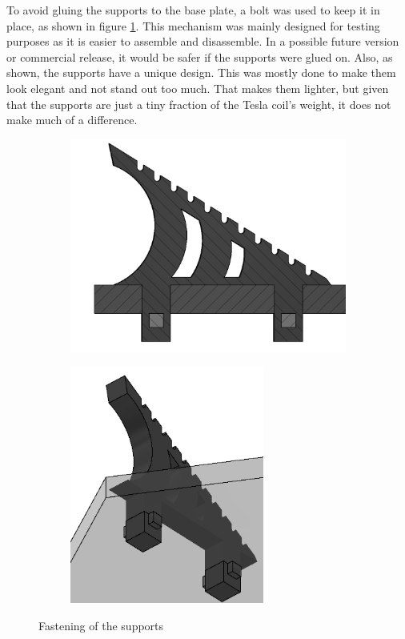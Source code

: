 To avoid gluing the supports to the base plate, a bolt was used to keep it in place, as shown in figure \ref{fig:stayer}. This mechanism was mainly designed for testing purposes as it is easier to assemble and disassemble. In a possible future version or commercial release, it would be safer if the supports were glued on. Also, as shown, the supports have a unique design. This was mostly done to make them look elegant and not stand out too much. That makes them lighter, but given that the supports are just a tiny fraction of the Tesla coil's weight, it does not make much of a difference.

\begin{figure}[h!]
    \begin{subfigure}{0.5\textwidth}
        \centering
        \includegraphics[width=\textwidth]{kassandra/resources/endeMeinerHoffnungInSemi2DStayer.PNG}
    \end{subfigure}%
    \begin{subfigure}{0.5\textwidth}
        \centering
        \includegraphics[width=0.7\textwidth]{kassandra/resources/endeMeinerHoffnungIn3DStayer.PNG}
    \end{subfigure}
    \centering
    \caption{Fastening of the supports}
    \label{fig:stayer}
\end{figure}

